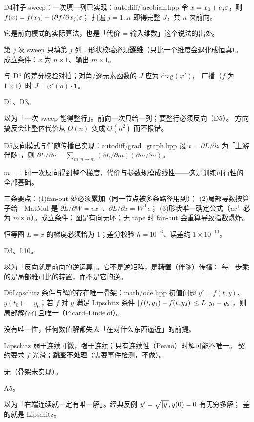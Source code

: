 \begin{know}{D4}{种子 sweep：一次填一列}{已实现：autodiff/jacobian.hpp}
 令 $x=x_0+e_j\varepsilon$，则 $f(x)=f(x_0)+(\partial f/\partial x_j)\varepsilon$；
扫遍 $j=1..n$ 即得完整 $J$，共 $n$ 次前向。

 它是前向模式的实际算法，也是「代价 = 输入维数」这个说法的出处。

 第 $j$ 次 sweep 只填第 $j$ 列；形状校验必须\textbf{逐维}（只比一个维度会退化成恒真）。
成立条件：$x$ 为 $n\times1$、输出 $m\times1$。

 与 D3 的差分校验对拍；对角/逐元素函数的 $J$ 应为 $\mathrm{diag}(\varphi')$，
广播（$f$ 为 $1\times1$）时 $J=\varphi'(a)\cdot\mathbf{1}$。

 D1、D3。

 以为「一次 sweep 能得整行」。前向一次只给一列；要整行必须反向（D5）。
方向搞反会让整体代价从 $O(n)$ 变成 $O(n^{2})$ 而不报错。
\end{know}

\begin{know}{D5}{反向模式与伴随传播}{已实现：autodiff/grad\_graph.hpp}
 设 $v=\partial L/\partial z$ 为「上游伴随」，则
$\partial L/\partial n=\sum_{m:n\to m}(\partial L/\partial m)(\partial m/\partial n)$。

 $m=1$ 时一次反向得到整个梯度，代价与参数规模成线性——这是训练可行性的全部基础。

 三条要点：(1)fan-out 处必须\textbf{累加}（同一节点被多条路径用到）；
(2)局部导数按算子给：MatMul 是 $\partial L/\partial W=vx^{\mathsf T}$、$\partial L/\partial x=W^{\mathsf T}v$；
(3)形状唯一确定公式（$vx^{\mathsf T}$ 必为 $m\times n$）。成立条件：图是有向无环；无 tape 时 fan-out 会重算导致指数爆炸。

 恒等图 $L=x$ 的梯度必须恰为 $1$；差分校验 $h=10^{-6}$、误差约 $1\times10^{-10}$。

 D3、L10。

 以为「反向就是前向的逆运算」。它不是逆矩阵，是\textbf{转置}（伴随）传播：
每一步乘的是局部雅可比的转置，而不是它的逆。
\end{know}

\begin{know}{D6}{Lipschitz 条件与解的存在唯一}{骨架：math/ode.hpp}
 初值问题 $y'=f(t,y)$、$y(t_0)=y_0$；若 $f$ 对 $y$ 满足 Lipschitz 条件
$\left\lvert f(t,y_1)-f(t,y_2)\right\rvert\le L\left\lvert y_1-y_2\right\rvert$，则局部解存在且唯一（Picard--Lindelöf）。

 没有唯一性，任何数值解都失去「在对什么东西逼近」的前提。

 Lipschitz 弱于连续可微，强于连续；只有连续性（Peano）时解可能不唯一。
契约要求 $f$ 光滑；\textbf{跳变不处理}（需要事件检测，不做）。

 无（骨架未实现）。

 A5。

 以为「右端连续就一定有唯一解」。经典反例 $y'=\sqrt{\left\lvert y\right\rvert},y(0)=0$ 有无穷多解；
差的就是 Lipschitz。
\end{know}

